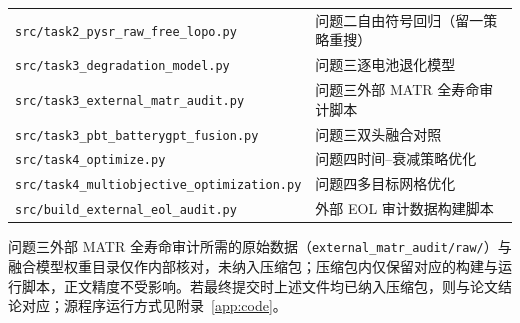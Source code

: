 \begin{table}[htbp]
\begin{tabular}{p{}p{}}
\texttt{src/task2\_pysr\_raw\_free\_lopo.py} & 问题二自由符号回归（留一策略重搜） \\
\texttt{src/task3\_degradation\_model.py} & 问题三逐电池退化模型 \\
\texttt{src/task3\_external\_matr\_audit.py} & 问题三外部 MATR 全寿命审计脚本 \\
\texttt{src/task3\_pbt\_batterygpt\_fusion.py} & 问题三双头融合对照 \\
\texttt{src/task4\_optimize.py} & 问题四时间--衰减策略优化 \\
\texttt{src/task4\_multiobjective\_optimization.py} & 问题四多目标网格优化 \\
\texttt{src/build\_external\_eol\_audit.py} & 外部 EOL 审计数据构建脚本 \\
\bottomrule
\end{tabular}
\end{table}

问题三外部 MATR 全寿命审计所需的原始数据（\texttt{external\_matr\_audit/raw/}）与融合模型权重目录仅作内部核对，未纳入压缩包；压缩包内仅保留对应的构建与运行脚本，正文精度不受影响。若最终提交时上述文件均已纳入压缩包，则与论文结论对应；源程序运行方式见附录~\ref{app:code}。
